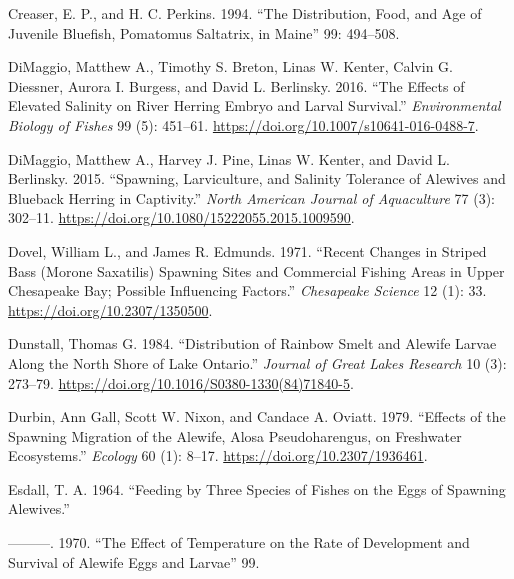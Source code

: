 \documentclass[
]{book}
\newlength{\cslhangindent}
\newlength{\cslentryspacingunit} %
\newenvironment{CSLReferences}[2] %
 {%
  \setlength{\parindent}{0pt}
  \ifodd #1
  \let\oldpar\par
  \def\par{\hangindent=\cslhangindent\oldpar}
  \fi
  \setlength{\parskip}{#2\cslentryspacingunit}
 }%
 {}
\begin{document}
\begin{CSLReferences}{1}{0}
\leavevmode{}%
Creaser, E. P., and H. C. Perkins. 1994. {``The Distribution, Food, and Age of Juvenile Bluefish, {Pomatomus} Saltatrix, in {Maine}''} 99: 494--508.

\leavevmode{}%
DiMaggio, Matthew A., Timothy S. Breton, Linas W. Kenter, Calvin G. Diessner, Aurora I. Burgess, and David L. Berlinsky. 2016. {``The Effects of Elevated Salinity on River Herring Embryo and Larval Survival.''} \emph{Environmental Biology of Fishes} 99 (5): 451--61. \url{https://doi.org/10.1007/s10641-016-0488-7}.

\leavevmode{}%
DiMaggio, Matthew A., Harvey J. Pine, Linas W. Kenter, and David L. Berlinsky. 2015. {``Spawning, {Larviculture}, and {Salinity} {Tolerance} of {Alewives} and {Blueback} {Herring} in {Captivity}.''} \emph{North American Journal of Aquaculture} 77 (3): 302--11. \url{https://doi.org/10.1080/15222055.2015.1009590}.

\leavevmode{}%
Dovel, William L., and James R. Edmunds. 1971. {``Recent {Changes} in {Striped} {Bass} ({Morone} Saxatilis) {Spawning} {Sites} and {Commercial} {Fishing} {Areas} in {Upper} {Chesapeake} {Bay}; {Possible} {Influencing} {Factors}.''} \emph{Chesapeake Science} 12 (1): 33. \url{https://doi.org/10.2307/1350500}.

\leavevmode{}%
Dunstall, Thomas G. 1984. {``Distribution of {Rainbow} {Smelt} and {Alewife} {Larvae} {Along} the {North} {Shore} of {Lake} {Ontario}.''} \emph{Journal of Great Lakes Research} 10 (3): 273--79. \url{https://doi.org/10.1016/S0380-1330(84)71840-5}.

\leavevmode{}%
Durbin, Ann Gall, Scott W. Nixon, and Candace A. Oviatt. 1979. {``Effects of the {Spawning} {Migration} of the {Alewife}, {Alosa} {Pseudoharengus}, on {Freshwater} {Ecosystems}.''} \emph{Ecology} 60 (1): 8--17. \url{https://doi.org/10.2307/1936461}.

\leavevmode{}%
Esdall, T. A. 1964. {``Feeding by Three Species of Fishes on the Eggs of Spawning Alewives.''}

\leavevmode{}%
---------. 1970. {``The Effect of Temperature on the Rate of Development and Survival of Alewife Eggs and Larvae''} 99.


\end{CSLReferences}
\end{document}
